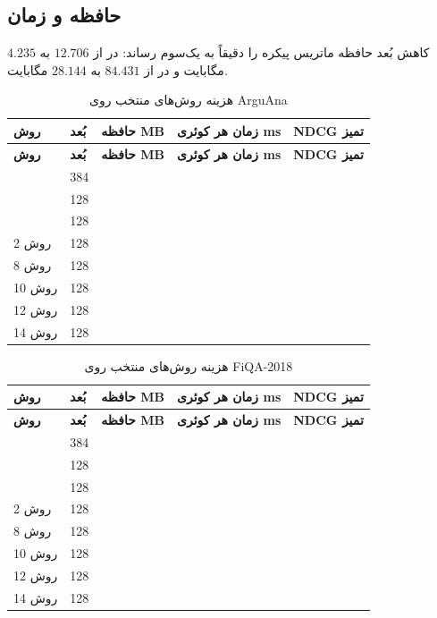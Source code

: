 \documentclass[a4paper,12pt]{article}
\begin{document}
\subsection{حافظه و زمان}
کاهش بُعد حافظه ماتریس پیکره را دقیقاً به یک‌سوم رساند: در  از $12.706$ به $4.235$ مگابایت و در  از $84.431$ به $28.144$ مگابایت.
\scriptsize
\begin{longtable}{|C{3.5cm}|C{1.8cm}|C{2.5cm}|C{3cm}|C{2.5cm}|}
\caption{هزینه روش‌های منتخب روی ArguAna}\label{tab:arg-resource}\\
\hline
\textbf{روش} & \textbf{بُعد} & \textbf{حافظه MB} & \textbf{زمان هر کوئری ms} & \textbf{NDCG تمیز} \\
\hline
\endfirsthead
\hline
\textbf{روش} & \textbf{بُعد} & \textbf{حافظه MB} & \textbf{زمان هر کوئری ms} & \textbf{NDCG تمیز} \\
\hline
\endhead
{} & 384 &  &  &  \\
\hline
{} & 128 &  &  &  \\
\hline
{} & 128 &  &  &  \\
\hline
روش 2 & 128 &  &  &  \\
\hline
روش 8 & 128 &  &  &  \\
\hline
روش 10 & 128 &  &  &  \\
\hline
روش 12 & 128 &  &  &  \\
\hline
روش 14 & 128 &  &  &  \\
\hline
\end{longtable}
\scriptsize
\begin{longtable}{|C{3.5cm}|C{1.8cm}|C{2.5cm}|C{3cm}|C{2.5cm}|}
\caption{هزینه روش‌های منتخب روی FiQA-2018}\label{tab:fiqa-resource}\\
\hline
\textbf{روش} & \textbf{بُعد} & \textbf{حافظه MB} & \textbf{زمان هر کوئری ms} & \textbf{NDCG تمیز} \\
\hline
\endfirsthead
\hline
\textbf{روش} & \textbf{بُعد} & \textbf{حافظه MB} & \textbf{زمان هر کوئری ms} & \textbf{NDCG تمیز} \\
\hline
\endhead
{} & 384 &  &  &  \\
\hline
{} & 128 &  &  &  \\
\hline
{} & 128 &  &  &  \\
\hline
روش 2 & 128 &  &  &  \\
\hline
روش 8 & 128 &  &  &  \\
\hline
روش 10 & 128 &  &  &  \\
\hline
روش 12 & 128 &  &  &  \\
\hline
روش 14 & 128 &  &  &  \\
\hline
\end{longtable}
\end{document}
